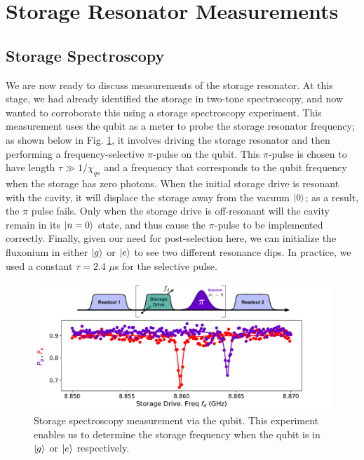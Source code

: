 
\clearpage
\section{Storage Resonator Measurements \label{sec:4_StorageChi}}

\subsection{Storage Spectroscopy}

We are now ready to discuss measurements of the storage resonator. At this stage, we had already identified the storage in two-tone spectroscopy, and now wanted to corroborate this using a storage spectroscopy experiment. This measurement uses the qubit as a meter to probe the storage resonator frequency; as shown below in Fig. \ref{fig:4_storage_spectroscopy}, it involves driving the storage resonator and then performing a frequency-selective $\pi$-pulse on the qubit. This $\pi$-pulse is chosen to have length $\tau \gg 1/\chi_{qs}$ and a frequency that corresponds to the qubit frequency when the storage has zero photons. When the initial storage drive is resonant with the cavity, it will displace the storage away from the vacuum $\lvert0\rangle$; as a result, the $\pi$ pulse fails. Only when the storage drive is off-resonant will the cavity remain in its $\lvert n=0\rangle$ state, and thus cause the $\pi$-pulse to be implemented correctly. Finally, given our need for post-selection here, we can initialize the fluxonium in either $\lvert g\rangle$ or $\lvert e\rangle$ to see two different resonance dips. In practice, we used a constant $\tau = 2.4$ $\mu$s for the selective pulse.
\begin{figure}[h]
    \centering
    \includegraphics[width=0.85\linewidth]{Figures/4/storage_spectroscopy.pdf}
    \caption{Storage spectroscopy measurement via the qubit. This experiment enables us to determine the storage frequency when the qubit is in $\lvert g\rangle$ or $\lvert e\rangle$ respectively.}
    \label{fig:4_storage_spectroscopy}
\end{figure}

